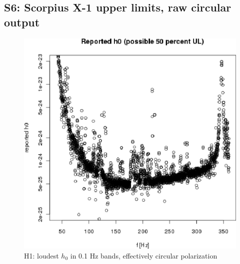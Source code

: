 \subsection{S6: Scorpius X-1 upper limits, raw circular output}

\begin{figure}
\begin{center}
\includegraphics[width=0.5\paperwidth,height=0.35\paperheight]{plots/h0FullUL50log-H1.eps}
\caption{
H1: loudest $h_0$ in 0.1 Hz bands, effectively circular polarization}
\label{S6_H1_raw_output_UL}
\end{center}
\end{figure}

